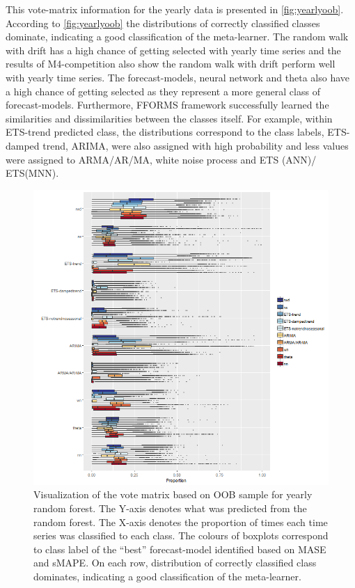 \documentclass[11pt,a4paper,]{article}
\begin{document}
This vote-matrix information for the yearly data is presented in
\autoref{fig:yearlyoob}. According to \autoref{fig:yearlyoob} the
distributions of correctly classified classes dominate, indicating a
good classification of the meta-learner. The random walk with drift has
a high chance of getting selected with yearly time series and the
results of M4-competition also show the random walk with drift perform
well with yearly time series. The forecast-models, neural network and
theta also have a high chance of getting selected as they represent a
more general class of forecast-models. Furthermore, FFORMS framework
successfully learned the similarities and dissimilarities between the
classes itself. For example, within ETS-trend predicted class, the
distributions correspond to the class labels, ETS-damped trend, ARIMA,
were also assigned with high probability and less values were assigned
to ARMA/AR/MA, white noise process and ETS (ANN)/ ETS(MNN).

\begin{figure}
\centering
\includegraphics{figures/yearlyoob-1.png}
\caption{\label{fig:yearlyoob}Visualization of the vote matrix based on OOB
sample for yearly random forest. The Y-axis denotes what was predicted
from the random forest. The X-axis denotes the proportion of times each
time series was classified to each class. The colours of boxplots
correspond to class label of the ``best'' forecast-model identified
based on MASE and sMAPE. On each row, distribution of correctly
classified class dominates, indicating a good classification of the
meta-learner.}
\end{figure}
\end{document}
